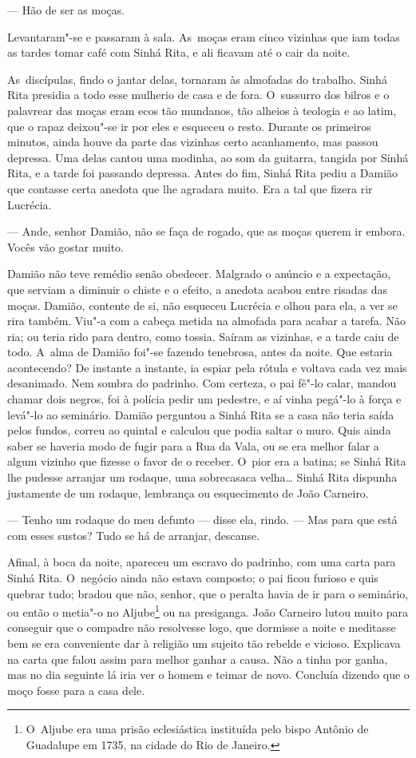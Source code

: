 \begin{linenumbers}
--- Hão de ser as moças.

Levantaram"-se e passaram à sala. As~moças eram cinco vizinhas que iam
todas as tardes tomar café com Sinhá Rita, e ali ficavam até o cair da
noite.

As~discípulas, findo o jantar delas, tornaram às almofadas do trabalho.
Sinhá Rita presidia a todo esse mulherio de casa e de fora. O~sussurro
dos bilros e o palavrear das moças eram ecos tão mundanos, tão alheios à
teologia e ao latim, que o rapaz deixou"-se ir por eles e esqueceu o
resto. Durante os primeiros minutos, ainda houve da parte das vizinhas
certo acanhamento, mas passou depressa. Uma delas cantou uma modinha, ao
som da guitarra, tangida por Sinhá Rita, e a tarde foi passando
depressa. Antes do fim, Sinhá Rita pediu a Damião que contasse certa
anedota que lhe agradara muito. Era a tal que fizera rir Lucrécia.

--- Ande, senhor Damião, não se faça de rogado, que as moças querem ir
embora. Vocês vão gostar muito.

Damião não teve remédio senão obedecer. Malgrado o anúncio e a
expectação, que serviam a diminuir o chiste e o efeito, a anedota acabou
entre risadas das moças. Damião, contente de si, não esqueceu Lucrécia e
olhou para ela, a ver se rira também. Viu"-a com a cabeça metida na
almofada para acabar a tarefa. Não ria; ou teria rido para dentro, como
tossia. Saíram as vizinhas, e a tarde caiu de todo. A~alma de Damião
foi"-se fazendo tenebrosa, antes da noite. Que estaria acontecendo? De
instante a instante, ia espiar pela rótula e voltava cada vez mais
desanimado. Nem sombra do padrinho. Com certeza, o pai fê"-lo calar,
mandou chamar dois negros, foi à polícia pedir um pedestre, e aí vinha
pegá"-lo à força e levá"-lo ao seminário. Damião perguntou a Sinhá Rita se
a casa não teria saída pelos fundos, correu ao quintal e calculou que
podia saltar o muro. Quis ainda saber se haveria modo de fugir para a
Rua da Vala, ou se era melhor falar a algum vizinho que fizesse o favor
de o receber. O~pior era a batina; se Sinhá Rita lhe pudesse arranjar um
rodaque, uma sobrecasaca velha\ldots{} Sinhá Rita dispunha justamente de um
rodaque, lembrança ou esquecimento de João Carneiro.

--- Tenho um rodaque do meu defunto --- disse ela, rindo. --- Mas para que
está com esses sustos? Tudo se há de arranjar, descanse.

Afinal, à boca da noite, apareceu um escravo do padrinho, com uma carta
para Sinhá Rita. O~negócio ainda não estava composto; o pai ficou
furioso e quis quebrar tudo; bradou que não, senhor, que o peralta havia
de ir para o seminário, ou então o metia"-o no Aljube\footnote{O~Aljube
  era uma prisão eclesiástica instituída pelo bispo Antônio de Guadalupe
  em 1735, na cidade do Rio de Janeiro.} ou na presiganga. João Carneiro
lutou muito para conseguir que o compadre não resolvesse logo, que
dormisse a noite e meditasse bem se era conveniente dar à religião um
sujeito tão rebelde e vicioso. Explicava na carta que falou assim para
melhor ganhar a causa. Não a tinha por ganha, mas no dia seguinte lá
iria ver o homem e teimar de novo. Concluía dizendo que o moço fosse
para a casa dele.


\end{linenumbers}
